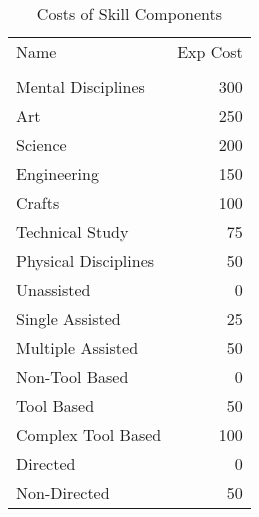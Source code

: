\begin{table}[h]
\centering
\caption{Costs of Skill Components}
	\begin{tabular}{lr} \hline
	Name                    &       Exp Cost  \\
	                        &                 \\	\hline
	Mental Disciplines      &       300       \\
	Art                     &       250       \\
	Science                 &       200       \\
	Engineering             &       150       \\
	Crafts                  &       100       \\
	Technical Study         &       75        \\
	Physical Disciplines    &       50        \\    \hline
	Unassisted              &        0        \\
	Single Assisted         &        25       \\
	Multiple Assisted       &        50       \\    \hline
	Non-Tool Based          &        0        \\
	Tool Based              &        50       \\
	Complex Tool Based      &        100      \\    \hline
	Directed                &        0        \\
	Non-Directed            &        50       \\    \hline
	\end{tabular}
\end{table}

